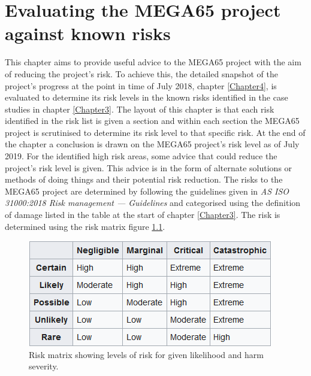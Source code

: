%

\chapter{Evaluating the MEGA65 project against known risks}
\label{Chapter5}
This chapter aims to provide useful advice to the MEGA65 project with the aim of reducing the project's risk. To achieve this, the detailed snapshot of the project's progress at the point in time of July 2018, chapter \ref{Chapter4}, is evaluated to determine its risk levels in the known risks identified in the case studies in chapter \ref{Chapter3}. The layout of this chapter is that each risk identified in the risk list is given a section and within each section the MEGA65 project is scrutinised to determine its risk level to that specific risk. At the end of the chapter a conclusion is drawn on the MEGA65 project's risk level as of July 2019. For the identified high risk areas, some advice that could reduce the project's risk level is given. This advice is in the form of alternate solutions or methods of doing things and their potential risk reduction. The risks to the MEGA65 project are determined by following the guidelines given in \textit{AS ISO 31000:2018 Risk management — Guidelines} 
\cite{RN164} and categorised using the definition of damage listed in the table at the start of chapter \ref{Chapter3}. The risk is determined using the risk matrix figure \ref{riskmatrix}.

\begin{figure} \begin{center}
\includegraphics[width=.3\linewidth]{pics/riskmatrix} 
\end{center} 
\caption{Risk matrix showing levels of risk for given likelihood and harm severity.\\}
\label{riskmatrix}
\end{figure}

